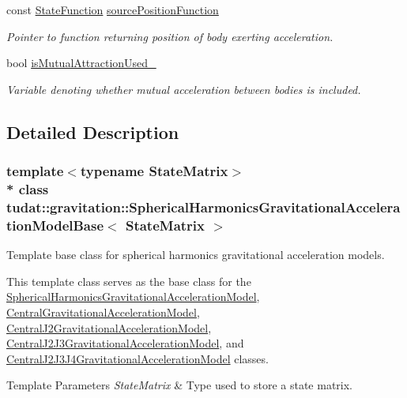 \begin{DoxyCompactItemize}
const \hyperlink{classtudat_1_1gravitation_1_1SphericalHarmonicsGravitationalAccelerationModelBase_a4ca706c4f941be481fc5f490e49390d8}{State\+Function} \hyperlink{classtudat_1_1gravitation_1_1SphericalHarmonicsGravitationalAccelerationModelBase_a90738dd2d368872dc3ac4b163ab98ece}{source\+Position\+Function}
\begin{DoxyCompactList}\small\item\em Pointer to function returning position of body exerting acceleration. \end{DoxyCompactList}\item 
bool \hyperlink{classtudat_1_1gravitation_1_1SphericalHarmonicsGravitationalAccelerationModelBase_a103da0d449d50376af758f527bbe5131}{is\+Mutual\+Attraction\+Used\+\_\+}
\begin{DoxyCompactList}\small\item\em Variable denoting whether mutual acceleration between bodies is included. \end{DoxyCompactList}\end{DoxyCompactItemize}


\subsection{Detailed Description}
\subsubsection*{template$<$typename State\+Matrix$>$\\*
class tudat\+::gravitation\+::\+Spherical\+Harmonics\+Gravitational\+Acceleration\+Model\+Base$<$ State\+Matrix $>$}

Template base class for spherical harmonics gravitational acceleration models. 

This template class serves as the base class for the \hyperlink{classtudat_1_1gravitation_1_1SphericalHarmonicsGravitationalAccelerationModel}{Spherical\+Harmonics\+Gravitational\+Acceleration\+Model}, \hyperlink{classtudat_1_1gravitation_1_1CentralGravitationalAccelerationModel}{Central\+Gravitational\+Acceleration\+Model}, \hyperlink{classtudat_1_1gravitation_1_1CentralJ2GravitationalAccelerationModel}{Central\+J2\+Gravitational\+Acceleration\+Model}, \hyperlink{classtudat_1_1gravitation_1_1CentralJ2J3GravitationalAccelerationModel}{Central\+J2\+J3\+Gravitational\+Acceleration\+Model}, and \hyperlink{classtudat_1_1gravitation_1_1CentralJ2J3J4GravitationalAccelerationModel}{Central\+J2\+J3\+J4\+Gravitational\+Acceleration\+Model} classes. 
\begin{DoxyTemplParams}{Template Parameters}
{\em State\+Matrix} & Type used to store a state matrix. \\
\hline
\end{DoxyTemplParams}


